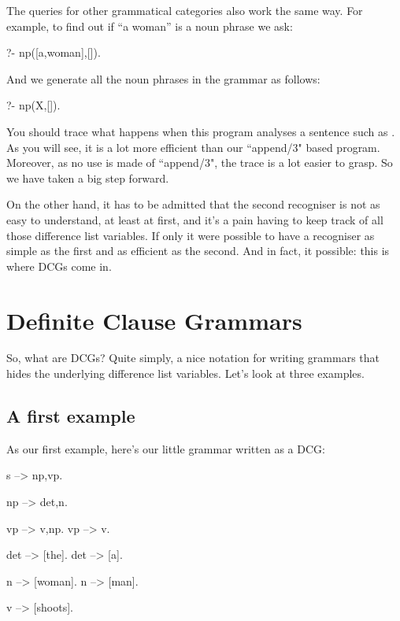 The queries for other grammatical categories also work the same way.
For example, to find out if ``a woman'' is a noun phrase we ask:
\begin{LPNcodedisplay}
?- np([a,woman],[]).
\end{LPNcodedisplay}
And we generate all the noun phrases in the grammar as follows:
\begin{LPNcodedisplay}
?- np(X,[]).
\end{LPNcodedisplay}


You should trace what happens when this program analyses a sentence
such as .  As you will see, it is a lot
more efficient than our ``append/3" based program.  Moreover, as no use
is made of ``append/3", the trace is a lot easier to grasp.  So we have
taken a big step forward.

On the other hand, it has to be admitted that the second recogniser is
not as easy to understand, at least at first, and it's a pain having
to keep track of all those difference list variables.  If only it were
possible to have a recogniser as simple as the first and as efficient
as the second. And in fact, it  possible: this is  where
DCGs come in.



\section{Definite Clause Grammars}\label{SEC.L7.DCG}

So, what are DCGs?  Quite simply, a nice notation for writing
grammars that hides the underlying difference list variables.
Let's look at three examples.



\subsection*{A first example}\label{SUBSEC.L7.FIRSTEXAMPLE}

As our first example, here's our little grammar written as a DCG:

\begin{LPNcodedisplay}
s --> np,vp.

np --> det,n.

vp --> v,np.
vp --> v.

det --> [the].
det --> [a].

n  --> [woman].
n  --> [man].

v --> [shoots].
\end{LPNcodedisplay}

